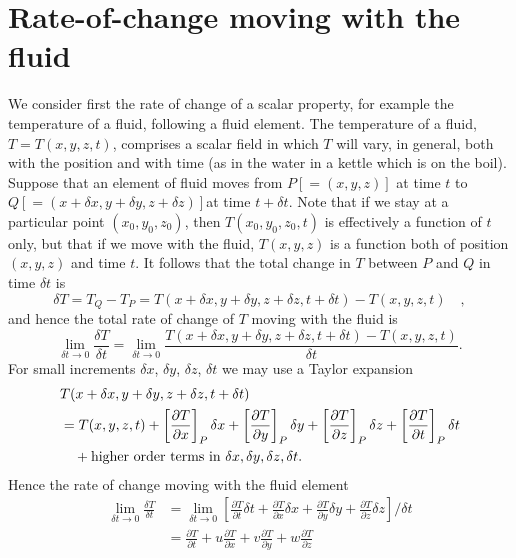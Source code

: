 \documentclass[10pt]{report}
\begin{document}
\section{Rate-of-change moving with the fluid}
We consider first the rate of change of a scalar property, for example the
temperature of a fluid, following a fluid element. The temperature of a
fluid, $T = T(x,y,z,t)$, comprises a scalar field in which $T$ will vary, in
general, both with the position and with time (as in the water in a kettle
which is on the boil). Suppose that an element of fluid moves from
$P[=(x,y,z)]$ at time $t$ to $Q[=(x+\delta
x,y+\delta y,z+\delta z)]$at time $ t + \delta t$.
Note that if we stay at a particular point $(x_{0},y_{0},z_{0})$, then
$T(x_{0},y_{0},z_{0},t)$ is effectively a function of $t$ only, but that
if we move with the fluid, $T(x,y,z)$ is a function both of position $(x,y,z)$
and time $t$. It follows that the total change in $T$ between $P$ and $Q$ in time
$\delta t$ is
\[
\delta T=T_Q -T_P =T(x+\delta
x,y+\delta y,z+\delta z,t+\delta
t)-T(x,y,z,t)\quad ,
\]
and hence the total rate of change of $T$ moving with the fluid is
\[
\mathop {\lim }\limits_{\delta t\to 0} \frac{\delta T}{\delta
t}=\mathop {\lim }\limits_{\delta t\to 0}
\frac{T(x+\delta x,y+\delta
y,z+\delta z,t+\delta
t)-T(x,y,z,t)}{\delta t}.
\]
For small increments $\delta x$, $\delta y$, $\delta z$, $\delta t$ we may
use a Taylor expansion
\begin{align*}
&T(x+\delta x,y+\delta y,z+\delta
z,t+\delta t) \\
& =T(x,y,z,t)+\left[
{\frac{\partial T}{\partial x}} \right]_P \delta x+
\left[ {\frac{\partial T}{\partial y}} \right]_P \delta y+\left[
{\frac{\partial T}{\partial z}} \right]_P \delta z+\left[
{\frac{\partial T}{\partial t}} \right]_P \delta t \\
& \quad +
\hbox{higher order terms in }\delta
x,\delta y,\delta z,\delta t.
\end{align*}
Hence the rate of change moving with the fluid element
\begin{align*}
\mathop {\lim }\limits_{\delta t\to 0} \frac{\delta T}{\delta
t}
&=\mathop {\lim }\limits_{\delta t\to 0} \left[ {\frac{\partial
T}{\partial t}\delta t+\frac{\partial T}{\partial x}\delta
x+\frac{\partial T}{\partial y}\delta y+\frac{\partial
T}{\partial z}\delta z} \right]/\delta t
\\
&
=\frac{\partial T}{\partial t}+u\frac{\partial T}{\partial
x}+v\frac{\partial T}{\partial y}+w\frac{\partial
T}{\partial z}
\end{align*}
\end{document}
